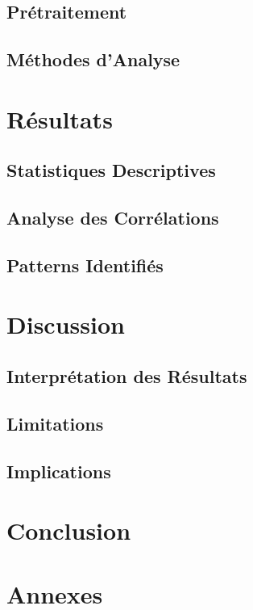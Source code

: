 \documentclass[12pt,a4paper]{article}
\begin{document}
\subsection{Prétraitement}
\subsection{Méthodes d'Analyse}

\section{Résultats}
\subsection{Statistiques Descriptives}
\subsection{Analyse des Corrélations}
\subsection{Patterns Identifiés}

\section{Discussion}
\subsection{Interprétation des Résultats}
\subsection{Limitations}
\subsection{Implications}

\section{Conclusion}

\appendix
\section{Annexes}



\end{document}
